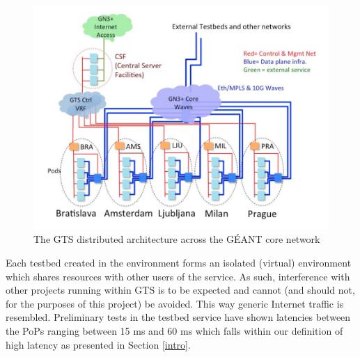 \begin{figure}[!ht]
   \centering
   \includegraphics[scale=0.32]{img/gts_env.png}
   \caption{The GTS distributed architecture across the GÉANT core network}
   \label{fig:gts_env}
\end{figure}

Each testbed created in the environment forms an isolated (virtual) environment which shares resources with other users of the service. As such, interference with other projects running within GTS is to be expected and cannot (and should not, for the purposes of this project) be avoided. This way generic Internet traffic is resembled. Preliminary tests in the testbed service have shown latencies between the PoPs ranging between 15 ms and 60 ms which falls within our definition of high latency as presented in Section \ref{intro}.

